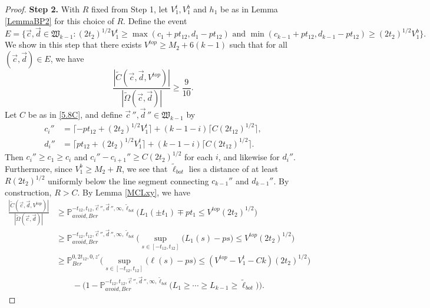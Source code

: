 \begin{proof}
	{\bf \raggedleft Step 2.} With $R$ fixed from Step 1, let $V_1^t, V_1^b$ and $h_1$ be as in Lemma \ref{LemmaBP2}  for this choice of $R$. Define the event
	$$E = \{ \vec{c}, \vec{d} \in \mathfrak{W}_{k-1}: (2t_2)^{1/2} V_1^t \geq \max(c_1 + p t_{12}, d_1 - pt_{12}) \mbox{ and }\min(c_{k-1} + p t_{12}, d_{k-1} - pt_{12})  \geq (2t_2)^{1/2} V_1^b \}.$$
	We show in this step that there exists $V^{top} \geq M_2 + 6(k-1)$ such that for all $(\vec{c}, \vec{d}) \in E$, we have
	\begin{equation}\label{5.8step2}
	\frac{|\tilde{C}(\vec{c}, \vec{d}, V^{top})|}{|\tilde{\Omega}(\vec{c},\vec{d})|} \geq  \frac{9}{10}.
	\end{equation}
	Let $C$ be as in \eqref{5.8C}, and define $\vec{c}\,'', \vec{d}\,'' \in \mathfrak{W}_{k-1}$ by
	\begin{align*}
	c_i'' &= \lceil -pt_{12} + (2t_2)^{1/2} V_1^t\rceil + (k-1-i)\lceil C(2t_{12})^{1/2}\rceil,\\
	d_i'' &= \lceil pt_{12} + (2t_2)^{1/2} V_1^t\rceil + (k-1-i)\lceil C(2t_{12})^{1/2}\rceil.
	\end{align*}
	Then $c_i'' \geq c_1 \geq c_i$ and $c_i'' - c_{i+1}'' \geq C(2t_2)^{1/2}$ for each $i$, and likewise for $d_i''$. Furthermore, since $V_1^b \geq M_2+R$, we see that $\tilde{\ell}_{bot}$ lies a distance of at least $R(2t_2)^{1/2}$ uniformly below the line segment connecting $c_{k-1}''$ and $d_{k-1}''$. By construction, $R>C$. By Lemma \ref{MCLxy}, we have
	\begin{equation}\label{5.8step3split}
	\begin{split}
	\frac{|\tilde{C}(\vec{c}, \vec{d}, V^{top})|}{|\tilde{\Omega}(\vec{c},\vec{d})|} &\geq \mathbb{P}^{-t_{12},t_{12},\vec{c}\,'', \vec{d}\,'', \infty,\tilde{\ell}_{bot}}_{avoid, Ber}\Big(L_1(\pm t_1) \mp pt_1 \leq V^{top}(2t_2)^{1/2}\Big)\\
	&\geq \mathbb{P}^{-t_{12},t_{12},\vec{c}\,'', \vec{d}\,'', \infty,\tilde{\ell}_{bot}}_{avoid, Ber}\Big(\sup_{s\in[-t_{12},t_{12}]}\big(L_1(s) - ps\big) \leq V^{top}(2t_2)^{1/2}\Big)\\
	&\geq \mathbb{P}^{0,2t_{12},0,z'}_{Ber}\Big(\sup_{s\in[-t_{12},t_{12}]}\big(\ell(s) - ps\big) \leq (V^{top}-V_1^t-Ck)(2t_2)^{1/2}\Big)\\ 
	&\qquad - \big(1 - \mathbb{P}^{-t_{12},t_{12},\vec{c}\,'', \vec{d}\,'', \infty,\tilde{\ell}_{bot}}_{avoid, Ber}\big(L_1\geq\cdots\geq L_{k-1}\geq\tilde{\ell}_{bot}\big)\big).
	\end{split}
	\end{equation}

\end{proof}
